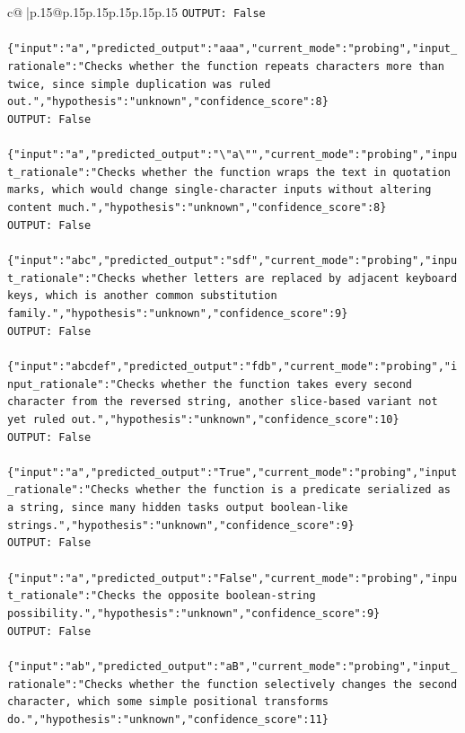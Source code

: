\documentclass{article}
\begin{document}
{\begin{supertabular}{c@{$\;$}|p{.15\linewidth}@{}p{.15\linewidth}p{.15\linewidth}p{.15\linewidth}p{.15\linewidth}p{.15\linewidth}}
{{{\texttt{OUTPUT: False} \\
\\ 
\texttt{\{"input":"a","predicted\_output":"aaa","current\_mode":"probing","input\_rationale":"Checks whether the function repeats characters more than twice, since simple duplication was ruled out.","hypothesis":"unknown","confidence\_score":8\}} \\
\texttt{OUTPUT: False} \\
\\ 
\texttt{\{"input":"a","predicted\_output":"\textbackslash{}"a\textbackslash{}"","current\_mode":"probing","input\_rationale":"Checks whether the function wraps the text in quotation marks, which would change single{-}character inputs without altering content much.","hypothesis":"unknown","confidence\_score":8\}} \\
\texttt{OUTPUT: False} \\
\\ 
\texttt{\{"input":"abc","predicted\_output":"sdf","current\_mode":"probing","input\_rationale":"Checks whether letters are replaced by adjacent keyboard keys, which is another common substitution family.","hypothesis":"unknown","confidence\_score":9\}} \\
\texttt{OUTPUT: False} \\
\\ 
\texttt{\{"input":"abcdef","predicted\_output":"fdb","current\_mode":"probing","input\_rationale":"Checks whether the function takes every second character from the reversed string, another slice{-}based variant not yet ruled out.","hypothesis":"unknown","confidence\_score":10\}} \\
\texttt{OUTPUT: False} \\
\\ 
\texttt{\{"input":"a","predicted\_output":"True","current\_mode":"probing","input\_rationale":"Checks whether the function is a predicate serialized as a string, since many hidden tasks output boolean{-}like strings.","hypothesis":"unknown","confidence\_score":9\}} \\
\texttt{OUTPUT: False} \\
\\ 
\texttt{\{"input":"a","predicted\_output":"False","current\_mode":"probing","input\_rationale":"Checks the opposite boolean{-}string possibility.","hypothesis":"unknown","confidence\_score":9\}} \\
\texttt{OUTPUT: False} \\
\\ 
\texttt{\{"input":"ab","predicted\_output":"aB","current\_mode":"probing","input\_rationale":"Checks whether the function selectively changes the second character, which some simple positional transforms do.","hypothesis":"unknown","confidence\_score":11\}} \\
}}}
\end{supertabular}}
\end{document}
